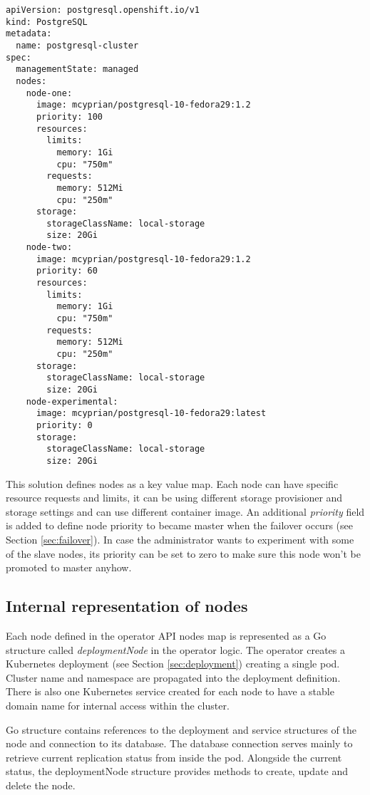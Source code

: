 \documentclass[
  digital, %
  twoside, %
  table,   %
  lof,     %
  lot,     %
]{fithesis3}
\begin{document}
\begin{lstlisting}
apiVersion: postgresql.openshift.io/v1
kind: PostgreSQL
metadata:
  name: postgresql-cluster
spec:
  managementState: managed
  nodes:
    node-one:
      image: mcyprian/postgresql-10-fedora29:1.2
      priority: 100
      resources:
        limits:
          memory: 1Gi
          cpu: "750m"
        requests:
          memory: 512Mi
          cpu: "250m"
      storage:
        storageClassName: local-storage
        size: 20Gi
    node-two:
      image: mcyprian/postgresql-10-fedora29:1.2
      priority: 60
      resources:
        limits:
          memory: 1Gi
          cpu: "750m"
        requests:
          memory: 512Mi
          cpu: "250m"
      storage:
        storageClassName: local-storage
        size: 20Gi
    node-experimental:
      image: mcyprian/postgresql-10-fedora29:latest
      priority: 0
      storage:
        storageClassName: local-storage
        size: 20Gi
\end{lstlisting}

This solution defines nodes as a key value map. Each node can have specific resource requests and limits, it can be using different storage provisioner and storage settings and can use different container image. An additional \textit{priority} field is added to define node priority to became master when the failover occurs (see Section \ref{sec:failover}). In case the administrator wants to experiment with some of the slave nodes, its priority can be set to zero to make sure this node won't be promoted to master anyhow.

\subsection{Internal representation of nodes}
 Each node defined in the operator API nodes map is represented as a Go structure called \textit{deploymentNode} in the operator logic. The operator creates a Kubernetes deployment (see Section \ref{sec:deployment}) creating a single pod. Cluster name and namespace are propagated into the deployment definition. There is also one Kubernetes service created for each node to have a stable domain name for internal access within the cluster.

 Go structure contains references to the deployment and service structures of the node and connection to its database. The database connection serves mainly to retrieve current replication status from inside the pod. Alongside the current status, the deploymentNode structure provides methods to create, update and delete the node.
\end{document}
